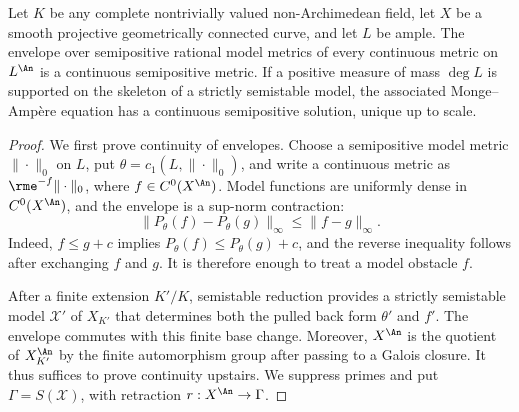 \begin{theorem}\label{thm:curves-arbitrary-field-continuity}
Let \(K\) be any complete nontrivially valued non-Archimedean field, let
\(X\) be a smooth projective geometrically connected curve, and let
\(L\) be ample.  The envelope over semipositive rational model metrics
of every continuous metric on \(L^{\An}\) is a
continuous semipositive metric.  If a positive measure of mass \(\deg L\)
is supported on the skeleton of a strictly semistable model, the associated
Monge--Amp\`ere equation has a continuous semipositive solution, unique up
to scale.
\end{theorem}
\begin{proof}
We first prove continuity of envelopes.  Choose a semipositive model metric
$\|\cdot\|_0$ on $L$, put $\theta=c_1(L,\|\cdot\|_0)$, and write a
continuous metric as
$\rme^{-f}\|\cdot\|_0$, where
$f\in C^0(X^{\An})$.  Model functions are uniformly dense in
$C^0(X^{\An})$, and the envelope is a sup-norm contraction:
\begin{equation}\label{eq:curve-envelope-contraction}
 \lVert P_\theta(f)-P_\theta(g)\rVert_\infty
 \leq\lVert f-g\rVert_\infty.
\end{equation}
Indeed, $f\leq g+c$ implies $P_\theta(f)\leq P_\theta(g)+c$, and the
reverse inequality follows after exchanging $f$ and $g$.  It is therefore
enough to treat a model obstacle $f$.

After a finite extension $K'/K$, semistable reduction provides a strictly
semistable model $\mathcal X'$ of $X_{K'}$ that determines both the pulled
back form $\theta'$ and $f'$.  The envelope commutes with this finite base
change.  Moreover, $X^{\An}$ is the quotient of $X_{K'}^{\An}$ by the
finite automorphism group after passing to a Galois closure.  It thus
suffices to prove continuity upstairs.  We suppress primes and put
$\Gamma=S(\mathcal X)$, with retraction
$r:X^{\An}\to\Gamma$.


\end{proof}
